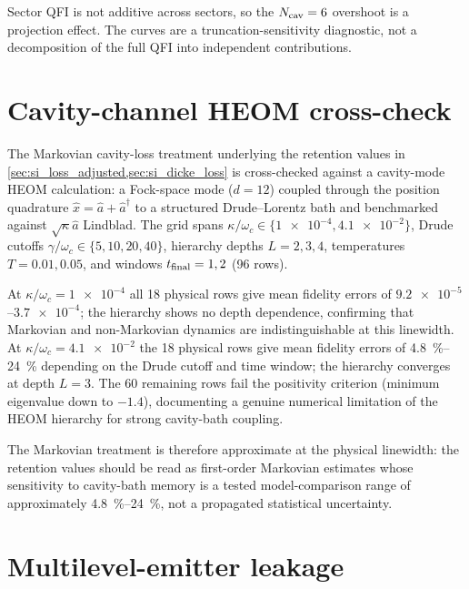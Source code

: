 \documentclass[aps,prxquantum,preprint,superscriptaddress,amsmath,amssymb]{revtex4-2}
\begin{document}
Sector QFI is not additive across sectors, so the $N_{\rm cav}=\num{6}$ overshoot is a projection effect. The curves are a truncation-sensitivity diagnostic, not a decomposition of the full QFI into independent contributions.

\section{Cavity-channel HEOM cross-check}
\label{sec:si_cavity_heom}

The Markovian cavity-loss treatment underlying the retention values in \cref{sec:si_loss_adjusted,sec:si_dicke_loss} is cross-checked against a cavity-mode HEOM calculation: a Fock-space mode ($d=\num{12}$) coupled through the position quadrature $\hat x=\hat a+\hat a^\dagger$ to a structured Drude--Lorentz bath and benchmarked against $\sqrt{\kappa}\hat a$ Lindblad. The grid spans $\kappa/\omega_c\in\{\num{1e-4},\num{4.1e-2}\}$, Drude cutoffs $\gamma/\omega_c\in\{\num{5},\num{10},\num{20},\num{40}\}$, hierarchy depths $L=\num{2},\num{3},\num{4}$, temperatures $T=\num{0.01},\num{0.05}$, and windows $t_{\rm final}=\num{1},\num{2}$ (\num{96} rows).

At $\kappa/\omega_c=\num{1e-4}$ all \num{18} physical rows give mean fidelity errors of $\num{9.2e-5}$--$\num{3.7e-4}$; the hierarchy shows no depth dependence, confirming that Markovian and non-Markovian dynamics are indistinguishable at this linewidth. At $\kappa/\omega_c=\num{4.1e-2}$ the \num{18} physical rows give mean fidelity errors of \qty{4.8}{\percent}--\qty{24}{\percent} depending on the Drude cutoff and time window; the hierarchy converges at depth $L=\num{3}$. The \num{60} remaining rows fail the positivity criterion (minimum eigenvalue down to $-\num{1.4}$), documenting a genuine numerical limitation of the HEOM hierarchy for strong cavity-bath coupling.

The Markovian treatment is therefore approximate at the physical linewidth: the retention values should be read as first-order Markovian estimates whose sensitivity to cavity-bath memory is a tested model-comparison range of approximately \qty{4.8}{\percent}--\qty{24}{\percent}, not a propagated statistical uncertainty.

\section{Multilevel-emitter leakage}
\label{sec:si_multilevel}
\end{document}
